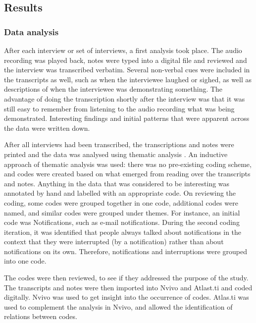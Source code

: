 \subsection{Results}
\subsubsection{Data analysis}
After each interview or set of interviews, a first analysis took place. The audio recording was played back, notes were typed into a digital file and reviewed and the interview was transcribed verbatim. Several non-verbal cues were included in the transcripts as well, such as when the interviewee laughed or sighed, as well as descriptions of when the interviewee was demonstrating something. The advantage of doing the transcription shortly after the interview was that it was still easy to remember from listening to the audio recording what was being demonstrated. Interesting findings and initial patterns that were apparent across the data were written down. 

After all interviews had been transcribed, the transcriptions and notes were printed and the data was analysed using thematic analysis \citep{Braun2006}. An inductive approach of thematic analysis was used: there was no pre-existing coding scheme, and codes were created based on what emerged from reading over the transcripts and notes. Anything in the data that was considered to be interesting was annotated by hand and labelled with an appropriate code. On reviewing the coding, some codes were grouped together in one code, additional codes were named, and similar codes were grouped under themes. For instance, an initial code was Notifications, such as e-mail notifications. During the second coding iteration, it was identified that people always talked about notifications in the context that they were interrupted (by a notification) rather than about notifications on its own. Therefore, notifications and interruptions were grouped into one code. 

The codes were then reviewed, to see if they addressed the purpose of the study. The transcripts and notes were then imported into Nvivo and Atlast.ti and coded digitally. Nvivo was used to get insight into the occurrence of codes. Atlas.ti was used to complement the analysis in Nvivo, and allowed the identification of relations between codes.


